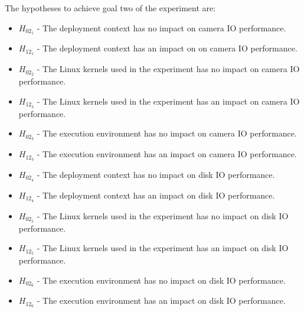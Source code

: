 The hypotheses to achieve goal two of the experiment are:
\begin{itemize}
\item $H_{02_{1}}$ - The deployment context has no impact on camera IO performance.
\item $H_{12_{1}}$ - The deployment context has an impact on on camera IO performance.
\item $H_{02_{2}}$ - The Linux kernels used in the experiment has no impact on camera IO performance.
\item $H_{12_{2}}$ - The Linux kernels used in the experiment has an impact on camera IO performance.
\item $H_{02_{3}}$ - The execution environment has no impact on camera IO performance.
\item $H_{12_{3}}$ - The execution environment has an impact on camera IO performance.
\item $H_{02_{4}}$ - The deployment context has no impact on disk IO performance.
\item $H_{12_{4}}$ - The deployment context has an impact on disk IO performance.
\item $H_{02_{5}}$ - The Linux kernels used in the experiment has no impact on disk IO performance.
\item $H_{12_{5}}$ - The Linux kernels used in the experiment has an impact on disk IO performance.
\item $H_{02_{6}}$ - The execution environment has no impact on disk IO performance.
\item $H_{12_{6}}$ - The execution environment has an impact on disk IO performance.
\end{itemize}
